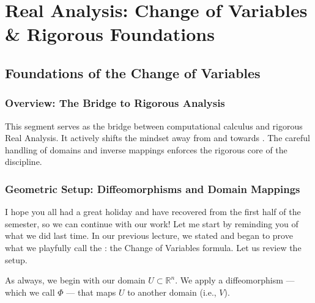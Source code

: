 \chapter{Real Analysis: Change of Variables \& Rigorous Foundations}

\section{Foundations of the Change of Variables}
\subsection{Overview: The Bridge to Rigorous Analysis}

\begin{nice-box}
This segment serves as the bridge between computational calculus and rigorous Real Analysis. It actively shifts the mindset away from  and towards . The careful handling of domains and inverse mappings enforces the rigorous core of the discipline.
\end{nice-box}


\subsection{Geometric Setup: Diffeomorphisms and Domain Mappings}

\begin{spoken-clean}[00:00:11 - 00:01:29]
I hope you all had a great holiday and have recovered from the first half of the semester, so we can continue with our work! Let me start by reminding you of what we did last time. In our previous lecture, we stated and began to prove what we playfully call the : the Change of Variables formula. Let us review the setup. 

As always, we begin with our domain $U \subset \mathbb{R}^n$. We apply a diffeomorphism — which we call $\Phi$ — that maps $U$ to another domain (i.e., $V$). 
\end{spoken-clean}


